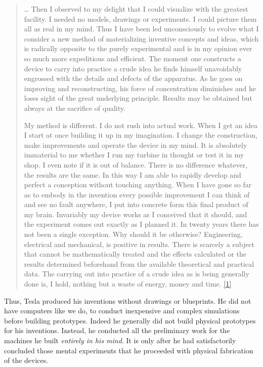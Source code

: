 \documentclass[
  12pt,
  british,
  a4paper,
  rgb,
  dvipsnames,
  svgnames,
  hyphens]{article}
\begin{document}
\begin{quote}
\ldots{} Then I observed to my delight that I could visualize with the
greatest facility. I needed no models, drawings or experiments. I could
picture them all as real in my mind. Thus I have been led unconsciously
to evolve what I consider a new method of materializing inventive
concepts and ideas, which is radically opposite to the purely
experimental and is in my opinion ever so much more expeditious and
efficient. The moment one constructs a device to carry into practice a
crude idea he finds himself unavoidably engrossed with the details and
defects of the apparatus. As he goes on improving and reconstructing,
his force of concentration diminishes and he loses sight of the great
underlying principle. Results may be obtained but always at the
sacrifice of quality.

My method is different. I do not rush into actual work. When I get an
idea I start at once building it up in my imagination. I change the
construction, make improvements and operate the device in my mind. It is
absolutely immaterial to me whether I run my turbine in thought or test
it in my shop. I even note if it is out of balance. There is no
difference whatever, the results are the same. In this way I am able to
rapidly develop and perfect a conception without touching anything. When
I have gone so far as to embody in the invention every possible
improvement I can think of and see no fault anywhere, I put into
concrete form this final product of my brain. Invariably my device works
as I conceived that it should, and the experiment comes out exactly as I
planned it. In twenty years there has not been a single exception. Why
should it be otherwise? Engineering, electrical and mechanical, is
positive in results. There is scarcely a subject that cannot be
mathematically treated and the effects calculated or the results
determined beforehand from the available theoretical and practical data.
The carrying out into practice of a crude idea as is being generally
done is, I hold, nothing but a waste of energy, money and time.
\protect\hyperlink{ref-john83}{{[}1{]}}
\end{quote}

Thus, Tesla produced his inventions without drawings or blueprints. He
did not have computers like we do, to conduct inexpensive and complex
simulations before building prototypes. Indeed he generally did not
build physical prototypes for his inventions. Instead, he conducted all
the preliminary work for the machines he built \emph{entirely in his
mind}. It is only after he had satisfactorily concluded those mental
experiments that he proceeded with physical fabrication of the devices.
\end{document}
